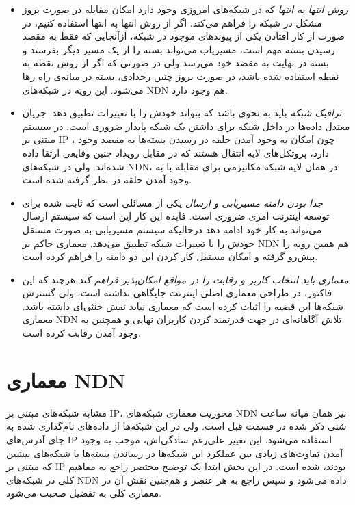 \begin{itemize}
{}

\item{
\textit{روش انتها به انتها}
 که در شبکه‌های امروزی وجود دارد امکان مقابله در صورت بروز مشکل در شبکه  را فراهم می‌کند. اگر از روش انتها به انتها استفاده کنیم، در صورت از کار افتادن یکی از پیوندهای موجود در شبکه، از‌آنجایی که فقط به مقصد رسیدن بسته مهم است، مسیریاب می‌تواند بسته را از یک مسیر دیگر بفرستد و بسته در نهایت به مقصد خود می‌رسد ولی در صورتی که اگر از روش نقطه به نقطه استفاده شده باشد، در صورت بروز چنین رخدادی، بسته در میانه‌ی راه رها می‌شود. این رویه در شبکه‌های NDN هم وجود دارد. 
}

\item{
\textit{ترافیک شبکه}
باید به نحوی باشد که بتواند خودش را با تغییرات تطبیق دهد. جریان معتدل داده‌ها در داخل شبکه برای داشتن یک شبکه پایدار ضروری است. در سیستم مبتنی بر IP ، چون امکان به وجود آمدن حلقه در رسیدن بسته‌ها به مقصد وجود دارد، پروتکل‌های لایه انتقال هستند که در مقابل رویداد چنین وقایعی ارتقا داده شده‌اند. ولی در شبکه‌‌های NDN، در همان لایه شبکه مکانیزمی برای مقابله با به وجود آمدن حلقه در نظر گرفته شده است. 
}
\item{
\textit{جدا بودن دامنه مسیریابی و ارسال}
یکی از مسائلی است که ثابت شده برای توسعه اینترنت امری ضروری است. فایده این کار این است که سیستم ارسال می‌تواند به کار خود ادامه دهد درحالیکه سیستم مسیریابی به صورت مستقل خودش را با تغییرات شبکه تطبیق می‌دهد.  معماری حاکم بر NDN هم همین رویه را پیش‌رو گرفته و امکان مستقل کار کردن این دو دامنه را فراهم کرده است. 
}

\item{
\textit{ معماری باید انتخاب کاربر و رقابت را در مواقع امکان‌پذیر فراهم کند }
هرچند که این فاکتور، در طراحی معماری اصلی اینترنت جایگاهی نداشته است، ولی گسترش شبکه‌ها این قضیه را اثبات کرده است که معماری نباید نقش خنثی‌ای داشته باشد. معماری NDN تلاش آگاهانه‌ای در جهت قدرتمند کردن کاربران نهایی و همچنین به وجود آمدن رقابت کرده است. 
}

\end{itemize}

\section{معماری NDN}
مشابه شبکه‌های مبتنی بر IP، محوریت معماری شبکه‌های NDN  نیز همان میانه ساعت شنی ذکر شده در قسمت قبل است. ولی در این شبکه‌ها از داده‌‌های نام‌گذاری شده به جای آدرس‌های IP استفاده می‌‌شود. این تغییر علی‌رغم سادگی‌اش، موجب به وجود آمدن تفاوت‌های زیادی بین عملکرد این شبکه‌ها در رساندن بسته‌ها با شبکه‌های پیشین که مبتنی بر IP بودند، شده است.  در این بخش ابتدا یک توضیح مختصر راجع به مفاهیم کلی در شبکه‌های NDN داده می‌شود و سپس راجع به هر عنصر و هم‌چنین نقش آن در معماری کلی به تفضیل صحبت می‌شود. \\

